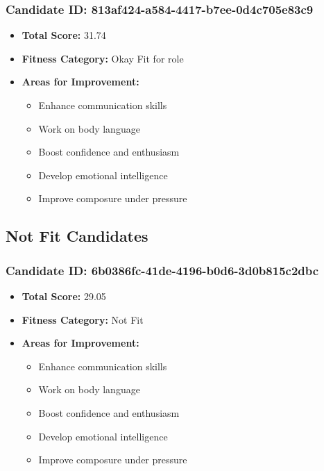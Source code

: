 \documentclass{article}
\begin{document}
\subsubsection{Candidate ID: 813af424-a584-4417-b7ee-0d4c705e83c9}
\begin{itemize}
    \item \textbf{Total Score:} 31.74
    \item \textbf{Fitness Category:} Okay Fit for role
    \item \textbf{Areas for Improvement:}
    \begin{itemize}
        \item Enhance communication skills
        \item Work on body language
        \item Boost confidence and enthusiasm
        \item Develop emotional intelligence
        \item Improve composure under pressure
    \end{itemize}
\end{itemize}

\subsection{Not Fit Candidates}

\subsubsection{Candidate ID: 6b0386fc-41de-4196-b0d6-3d0b815c2dbc}
\begin{itemize}
    \item \textbf{Total Score:} 29.05
    \item \textbf{Fitness Category:} Not Fit
    \item \textbf{Areas for Improvement:}
    \begin{itemize}
        \item Enhance communication skills
        \item Work on body language
        \item Boost confidence and enthusiasm
        \item Develop emotional intelligence
        \item Improve composure under pressure
    \end{itemize}
\end{itemize}
\end{document}
